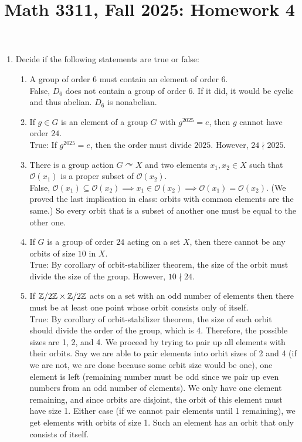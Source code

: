 \documentclass{amsart}
\title{Math 3311, Fall 2025: Homework 4}
\begin{document}
\maketitle

\begin{enumerate}

\item Decide if the following statements are true or false:
\begin{enumerate}
    \item A group of order $6$ must contain an element of order $6$.\\

    False, $D_6$ does not contain a group of order 6. If it did, it would be cyclic and thus abelian. $D_6$ is nonabelian.

	\item If $g\in G$ is an element of a group $G$ with $g^{2025} = e$, then $g$ cannot have order $24$.\\

    True: If $g^{2025}=e$, then the order must divide $2025$. However, $24\nmid 2025$.
    
	\item There is a group action $G\curvearrowright X$ and two elements $x_1,x_2\in X$ such that $\mathcal{O}(x_1)$ is a proper subset of $\mathcal{O}(x_2)$.\\

    False, $\mathcal{O}(x_1)\subseteq\mathcal{O}(x_2)\implies x_1\in\mathcal{O}(x_2)\implies\mathcal O(x_1)=\mathcal O(x_2)$. (We proved the last implication in class: orbits with common elements are the same.) So every orbit that is a subset of another one must be equal to the other one.


	\item If $G$ is a group of order $24$ acting on a set $X$, then there cannot be any orbits of size $10$ in $X$.\\

    True: By corollary of orbit-stabilizer theorem, the size of the orbit must divide the size of the group. However, $10\nmid 24$.

	\item If $\mathbb{Z}/2\mathbb{Z} \times \mathbb{Z}/2\mathbb{Z}$ acts on a set with an odd number of elements then there must be at least one point whose orbit consists only of itself.\\

    True: By corollary of orbit-stabilizer theorem, the size of each orbit should divide the order of the group, which is 4. Therefore, the possible sizes are 1, 2, and 4. We proceed by trying to pair up all elements with their orbits. Say we are able to pair elements into orbit sizes of 2 and 4 (if we are not, we are done because some orbit size would be one), one element is left (remaining number must be odd since we pair up even numbers from an odd number of elements). We only have one element remaining, and since orbits are disjoint, the orbit of this element must have size 1. Either case (if we cannot pair elements until 1 remaining), we get elements with orbits of size 1. Such an element has an orbit that only consists of itself.


\end{enumerate}
\end{enumerate}
\end{document}
